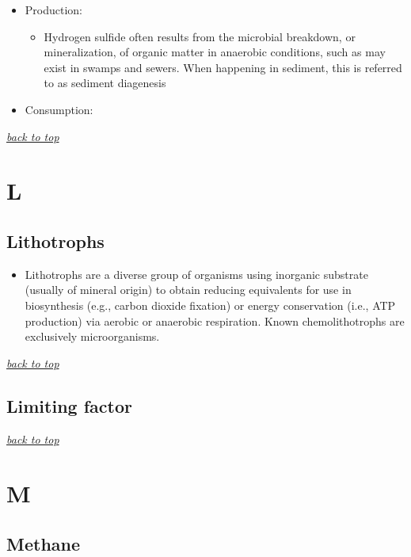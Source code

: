 \documentclass[]{book}
\providecommand{\tightlist}{%
  \setlength{\itemsep}{0pt}\setlength{\parskip}{0pt}}
\theoremstyle{definition}
\theoremstyle{definition}
\theoremstyle{definition}
\theoremstyle{remark}
\begin{document}
\begin{itemize}
\tightlist
\item
  Production:

  \begin{itemize}
  \tightlist
  \item
    Hydrogen sulfide often results from the microbial breakdown, or
    mineralization, of organic matter in anaerobic conditions, such as
    may exist in swamps and sewers. When happening in sediment, this is
    referred to as sediment diagenesis
  \end{itemize}
\item
  Consumption:
\end{itemize}

\emph{\protect\hyperlink{top}{back to top}}

\section{L}\label{l}

\hypertarget{lithotrophs}{\subsection{Lithotrophs}\label{lithotrophs}}

\begin{itemize}
\tightlist
\item
  Lithotrophs are a diverse group of organisms using inorganic substrate
  (usually of mineral origin) to obtain reducing equivalents for use in
  biosynthesis (e.g., carbon dioxide fixation) or energy conservation
  (i.e., ATP production) via aerobic or anaerobic respiration. Known
  chemolithotrophs are exclusively microorganisms.
  \citep{Wikipedia_contributors2018-na}
\end{itemize}

\emph{\protect\hyperlink{top}{back to top}}

\subsection{Limiting factor}\label{limiting-factor}

\emph{\protect\hyperlink{top}{back to top}}

\section{M}\label{m}

\subsection{Methane}\label{methane}
\end{document}
